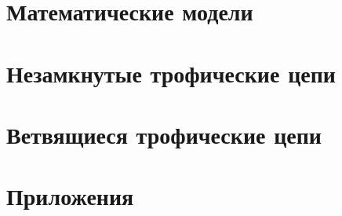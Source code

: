 \documentclass[
    14pt, 
    a4paper, 
    titlepage, 
    fleqn
]{extarticle}
\begin{document}
    
    
    \tableofcontents

    \pagebreak

    
    
    \pagebreak

    \section{Математические модели}
    

    \pagebreak

    

    \pagebreak

    \section{Незамкнутые трофические цепи}
    

    \pagebreak

    

    \pagebreak



    

    \section{Ветвящиеся трофические цепи}
    

    \pagebreak



    

    \pagebreak

    

    \pagebreak
    
    \section{Приложения}
    
\end{document}
